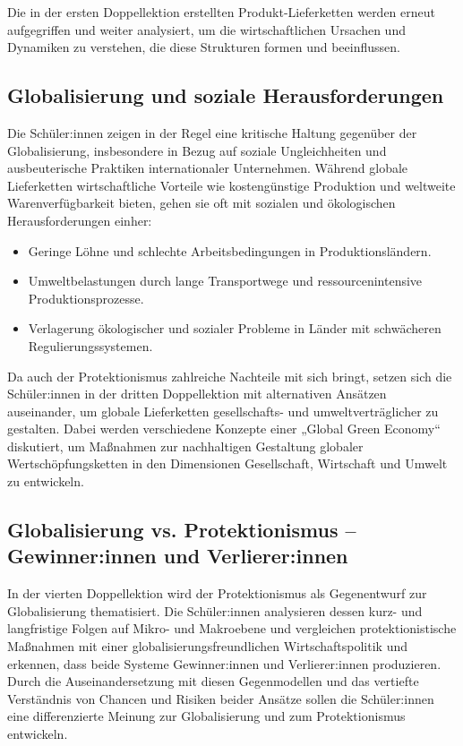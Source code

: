 Die in der ersten Doppellektion erstellten Produkt-Lieferketten werden erneut aufgegriffen und weiter analysiert, um die wirtschaftlichen Ursachen und Dynamiken zu verstehen, die diese Strukturen formen und beeinflussen.

\subsection{Globalisierung und soziale Herausforderungen}
Die Schüler:innen zeigen in der Regel eine kritische Haltung gegenüber der Globalisierung, insbesondere in Bezug auf soziale Ungleichheiten und ausbeuterische Praktiken internationaler Unternehmen. Während globale Lieferketten wirtschaftliche Vorteile wie kostengünstige Produktion und weltweite Warenverfügbarkeit bieten, gehen sie oft mit sozialen und ökologischen Herausforderungen einher:
\begin{itemize}
    \item Geringe Löhne und schlechte Arbeitsbedingungen in Produktionsländern.
    \item Umweltbelastungen durch lange Transportwege und ressourcenintensive Produktionsprozesse.
    \item Verlagerung ökologischer und sozialer Probleme in Länder mit schwächeren Regulierungssystemen.
\end{itemize}

Da auch der Protektionismus zahlreiche Nachteile mit sich bringt, setzen sich die Schüler:innen in der dritten Doppellektion mit alternativen Ansätzen auseinander, um globale Lieferketten gesellschafts- und umweltverträglicher zu gestalten. Dabei werden verschiedene Konzepte einer „Global Green Economy“ diskutiert, um Maßnahmen zur nachhaltigen Gestaltung globaler Wertschöpfungsketten in den Dimensionen Gesellschaft, Wirtschaft und Umwelt zu entwickeln.

\subsection{Globalisierung vs. Protektionismus – Gewinner:innen und Verlierer:innen}
In der vierten Doppellektion wird der Protektionismus als Gegenentwurf zur Globalisierung thematisiert. Die Schüler:innen analysieren dessen kurz- und langfristige Folgen auf Mikro- und Makroebene und vergleichen protektionistische Maßnahmen mit einer globalisierungsfreundlichen Wirtschaftspolitik und erkennen, dass beide Systeme Gewinner:innen und Verlierer:innen produzieren. Durch die Auseinandersetzung mit diesen Gegenmodellen und das vertiefte Verständnis von Chancen und Risiken beider Ansätze sollen die Schüler:innen eine differenzierte Meinung zur Globalisierung und zum Protektionismus entwickeln.

